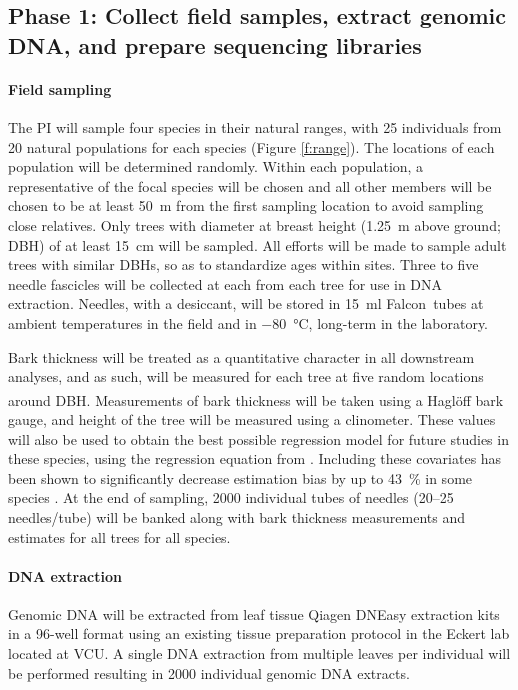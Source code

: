 \subsection*{Phase 1: Collect field samples, extract genomic DNA, and prepare sequencing libraries}

\paragraph{Field sampling}

The PI will sample four species in their natural ranges, with 25 individuals from 20 natural populations for each 
species (Figure \ref{f:range}).  The locations of each population will be determined randomly.  Within each population, a representative 
of the focal species will be chosen and all other members will be chosen to be at least \SI{50}{m} from the first sampling 
location to avoid sampling close relatives.  Only trees with diameter at breast height (\SI{1.25}{m} above ground; DBH) of at least 
\SI{15}{cm} will be sampled. All efforts will be made to sample adult trees with similar DBHs, so as to standardize ages within sites.
Three to five needle fascicles will be collected at each from each tree for use in DNA extraction.  Needles, with a desiccant, 
will be stored in \SI{15}{\ml} Falcon\texttrademark\ tubes  at ambient temperatures in the field and in \SI{-80}{\celsius}, 
long-term in the laboratory.  

Bark thickness will be treated as a quantitative character in all downstream analyses, and as such, will be measured for each tree at five 
random locations around DBH.  Measurements of bark thickness will be taken using a 
Hagl\"{o}ff\textsuperscript{\textregistered} bark gauge, and height of the tree will be measured using a clinometer.  These values 
will also be used to obtain the best possible regression model for future studies in these species, using the 
regression equation from \citeauthor{Cao:1986th}.  Including these covariates has been shown to significantly decrease estimation
bias by up to \SI{43}{\percent} in some species \citep{Li:2010bl}.  At the end of sampling, \num{2000} individual tubes of 
needles (20--25 needles/tube) will be banked along with bark thickness measurements and estimates for all trees for all species.

\paragraph{DNA extraction}
Genomic DNA will be extracted from leaf tissue Qiagen DNEasy extraction kits in a 96-well format using an existing tissue preparation
protocol in the Eckert lab located at VCU.  A single DNA extraction from multiple leaves per individual will be performed resulting in \num{2000} 
individual genomic DNA extracts.  

